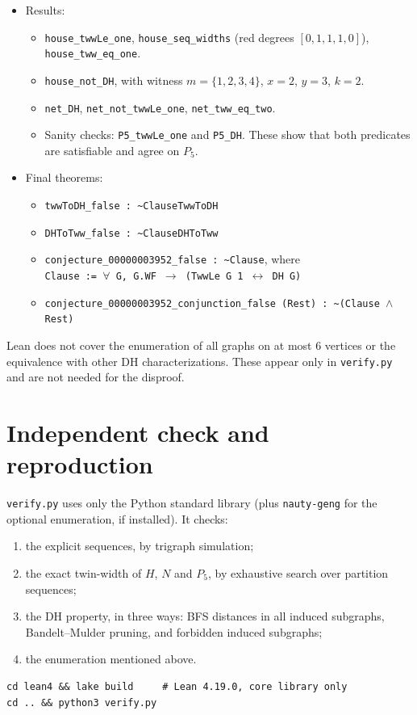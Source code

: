 \documentclass[11pt]{article}
\theoremstyle{definition}
\theoremstyle{remark}
\begin{document}
\begin{itemize}
\begin{itemize}
\end{itemize}
\item Results:
\begin{itemize}
\item \texttt{house\_twwLe\_one}, \texttt{house\_seq\_widths} (red degrees
$[0,1,1,1,0]$), \texttt{house\_tww\_eq\_one}.
\item \texttt{house\_not\_DH}, with witness $m=\{1,2,3,4\}$, $x=2$, $y=3$, $k=2$.
\item \texttt{net\_DH}, \texttt{net\_not\_twwLe\_one}, \texttt{net\_tww\_eq\_two}.
\item Sanity checks: \texttt{P5\_twwLe\_one} and \texttt{P5\_DH}. These show that both
predicates are satisfiable and agree on $P_5$.
\end{itemize}
\item Final theorems:
\begin{itemize}
\item \texttt{twwToDH\_false : \textasciitilde ClauseTwwToDH}
\item \texttt{DHToTww\_false : \textasciitilde ClauseDHToTww}
\item \texttt{conjecture\_00000003952\_false : \textasciitilde Clause}, where\\
\texttt{Clause := $\forall$ G, G.WF $\to$ (TwwLe G 1 $\leftrightarrow$ DH G)}
\item \texttt{conjecture\_00000003952\_conjunction\_false (Rest) : \textasciitilde (Clause
$\wedge$ Rest)}
\end{itemize}
\end{itemize}
Lean does not cover the enumeration of all graphs on at most $6$ vertices or the
equivalence with other DH characterizations. These appear only in \texttt{verify.py} and
are not needed for the disproof.

\section{Independent check and reproduction}
\texttt{verify.py} uses only the Python standard library (plus \texttt{nauty-geng} for the
optional enumeration, if installed). It checks:
\begin{enumerate}
\item the explicit sequences, by trigraph simulation;
\item the exact twin-width of $H$, $N$ and $P_5$, by exhaustive search over partition
sequences;
\item the DH property, in three ways: BFS distances in all induced subgraphs,
Bandelt--Mulder pruning, and forbidden induced subgraphs;
\item the enumeration mentioned above.
\end{enumerate}
\begin{verbatim}
cd lean4 && lake build     # Lean 4.19.0, core library only
cd .. && python3 verify.py
\end{verbatim}
\end{document}
